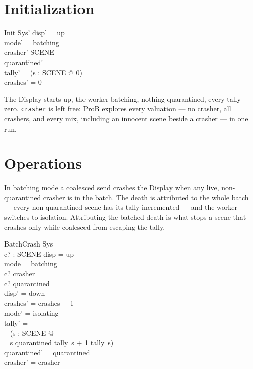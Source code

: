 \documentclass[a4paper,10pt,fleqn]{article}
\begin{document}
\section{Initialization}

\begin{schema}{Init}
  Sys'
\where
  disp' = up \\
  mode' = batching \\
  crasher' \subseteq SCENE \\
  quarantined' = \emptyset \\
  tally' = (\lambda s : SCENE @ 0) \\
  crashes' = 0
\end{schema}

The Display starts up, the worker batching, nothing quarantined, every tally
zero.  \texttt{crasher} is left free: ProB explores every valuation --- no
crasher, all crashers, and every mix, including an innocent scene beside a
crasher --- in one run.

\section{Operations}

In batching mode a coalesced send crashes the Display when any live,
non-quarantined crasher is in the batch.  The death is attributed to the whole
batch --- every non-quarantined scene has its tally incremented --- and the
worker switches to isolation.  Attributing the batched death is what stops a
scene that crashes only while coalesced from escaping the tally.

\begin{schema}{BatchCrash}
  \Delta Sys \\
  c? : SCENE
\where
  disp = up \\
  mode = batching \\
  c? \in crasher \\
  c? \notin quarantined \\
  disp' = down \\
  crashes' = crashes + 1 \\
  mode' = isolating \\
  tally' = \\
  \quad~ (\lambda s : SCENE @ \\
  \quad\quad~ \IF s \notin quarantined \THEN tally~s + 1 \ELSE tally~s) \\
  quarantined' = quarantined \\
  crasher' = crasher
\end{schema}
\end{document}
